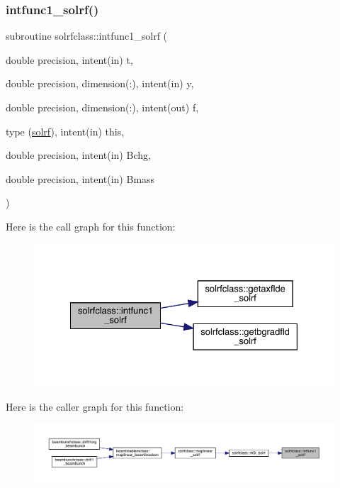 \subsubsection{\texorpdfstring{intfunc1\_solrf()}{intfunc1\_solrf()}}
{\footnotesize\ttfamily subroutine solrfclass\+::intfunc1\+\_\+solrf (\begin{DoxyParamCaption}\item[{double precision, intent(in)}]{t,  }\item[{double precision, dimension(\+:), intent(in)}]{y,  }\item[{double precision, dimension(\+:), intent(out)}]{f,  }\item[{type (\mbox{\hyperlink{namespacesolrfclass_structsolrfclass_1_1solrf}{solrf}}), intent(in)}]{this,  }\item[{double precision, intent(in)}]{Bchg,  }\item[{double precision, intent(in)}]{Bmass }\end{DoxyParamCaption})}

Here is the call graph for this function\+:\nopagebreak
\begin{figure}[H]
\begin{center}
\leavevmode
\includegraphics[width=328pt]{namespacesolrfclass_aaf806853862c8c4b3f448ca750500178_cgraph}
\end{center}
\end{figure}
Here is the caller graph for this function\+:\nopagebreak
\begin{figure}[H]
\begin{center}
\leavevmode
\includegraphics[width=350pt]{namespacesolrfclass_aaf806853862c8c4b3f448ca750500178_icgraph}
\end{center}
\end{figure}
\mbox{\label{namespacesolrfclass_a70f5e9afe73a56ed66363e6ca3207226}} 

